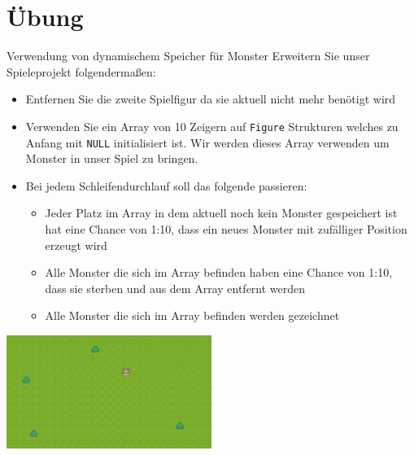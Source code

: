 \documentclass[presentation]{beamer}
\begin{document}
\section{Übung}
\label{sec:org4065126}
\begin{frame}[label={sec:org3d8ca73},fragile]{Verwendung von dynamischem Speicher für Monster}
 \footnotesize
Erweitern Sie unser Spieleprojekt folgendermaßen:
\begin{itemize}
\item \alert{Entfernen Sie die zweite Spielfigur} da sie aktuell nicht mehr
benötigt wird
\item Verwenden Sie ein \alert{Array} von 10 Zeigern auf {\color{solarizedYellow}\texttt{Figure} }Strukturen
welches zu Anfang mit {\color{solarizedYellow}\texttt{NULL} }\alert{initialisiert} ist. Wir werden dieses
Array verwenden um \alert{Monster} in unser Spiel zu bringen.
\item Bei \alert{jedem Schleifendurchlauf} soll das folgende passieren:
\begin{itemize}
\item Jeder Platz im Array in dem aktuell noch kein Monster gespeichert
ist hat eine Chance von 1:10, dass ein \alert{neues Monster} mit
zufälliger Position erzeugt wird
\item Alle Monster die sich im Array befinden haben eine Chance von
1:10, dass sie \alert{sterben und aus dem Array entfernt} werden
\item Alle Monster die sich im Array befinden \alert{werden gezeichnet}
\end{itemize}
\end{itemize}
\begin{center}\begin{center}
\includegraphics[width=0.5\textwidth]{data/ef/50772b-6721-4bd5-a274-efaba137299f/screenshot-20200406-225138.png}
\end{center}\end{center}
\end{frame}
\end{document}
